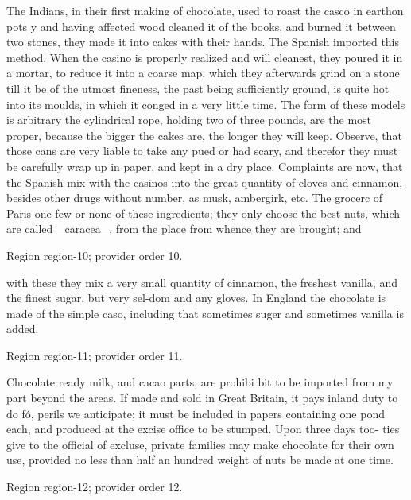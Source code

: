 \documentclass[11pt]{article}
\begin{document}
The Indians, in their first making of chocolate, used to roast the casco in earthon pots y and having affected wood cleaned it of the books, and burned it between two stones, they made it into cakes with their hands. The Spanish imported this method. When the casino is properly realized and will cleanest, they poured it in a mortar, to reduce it into a coarse map, which they afterwards grind on a stone till it be of the utmost fineness, the past being sufficiently ground, is quite hot into its moulds, in which it conged in a very little time. The form of these models is arbitrary the cylindrical rope, holding two of three pounds, are the most proper, because the bigger the cakes are, the longer they will keep. Observe, that those cans are very liable to take any pued or had scary, and therefor they must be carefully wrap up in paper, and kept in a dry place. Complaints are now, that the Spanish mix with the casinos into the great quantity of cloves and cinnamon, besides other drugs without number, as musk, ambergirk, etc. The grocerc of Paris one few or none of these ingredients; they only choose the best nuts, which are called \_caracea\_, from the place from whence they are brought; and
\par

{\scriptsize\color{gray} Region region-10; provider order 10.\par}
\medskip

with these they mix a very small quantity of cinnamon, the freshest vanilla, and the finest sugar, but very sel-dom and any gloves. In England the chocolate is made of the simple caso, including that sometimes suger and sometimes vanilla is added.
\par

{\scriptsize\color{gray} Region region-11; provider order 11.\par}
\medskip

Chocolate ready milk, and cacao parts, are prohibi bit to be imported from my part beyond the areas. If made and sold in Great Britain, it pays inland duty to do fó, perils we anticipate; it must be included in papers containing one pond each, and produced at the excise office to be stumped. Upon three days too- ties give to the official of excluse, private families may make chocolate for their own use, provided no less than half an hundred weight of nuts be made at one time.
\par

{\scriptsize\color{gray} Region region-12; provider order 12.\par}
\medskip
\end{document}
